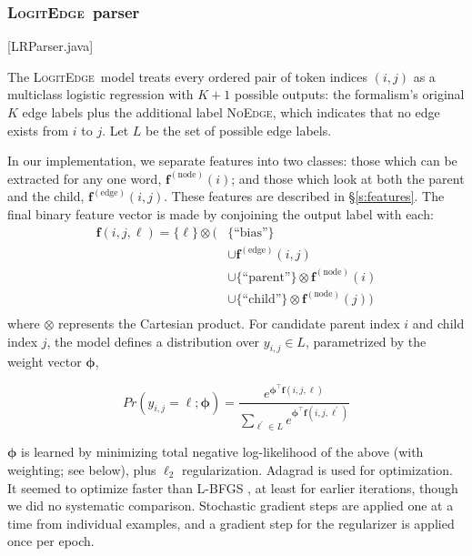 \documentclass[11pt]{article}
\newcommand{\codenote}[1]{\textcolor{PineGreen}{[#1]}}
\newcommand{\logitedge}{\textsc{LogitEdge}}
\newcommand{\noedge}{\textsc{NoEdge}}
\begin{document}
\subsubsection{\logitedge\ parser} 
\label{s:logitedge}


\codenote{LRParser.java}

The \logitedge\ model treats every ordered pair of token indices $(i, j)$ as a
multiclass logistic regression with $K+1$ possible outputs:
the formalism's original $K$ edge labels plus the additional label \noedge,
which indicates that no edge exists from $i$ to $j$.
Let $L$ be the set of possible edge labels.

In our implementation, we separate features into two classes:
those which can be extracted for any one word, $\bm{f}^{(\text{node})}(i)$;
and those which look at both the parent and the child,
$\bm{f}^{(\text{edge})}(i, j)$.
These features are described in \S\ref{s:features}.
The final binary feature vector is made by conjoining the output label with
each:
\begin{align*} 
\bm{f}(i, j, \ell) =
\{ \ell \} \otimes (& 
	\{ \text{``bias''} \} \\
	& \cup \bm{f}^{(\text{edge})}(i, j) \\
	& \cup \{ \text{``parent''} \} \otimes \bm{f}^{(\text{node})}(i) \\
	& \cup \{ \text{``child''} \} \otimes \bm{f}^{(\text{node})}(j)
)\\
\end{align*}
\noindent
where  $\otimes$ represents the Cartesian product.
For candidate parent index $i$ and child index $j$, the model defines a
distribution over $y_{i,j} \in L$, parametrized by the weight vector $\bm\phi$,

\begin{equation}
  Pr(y_{i,j}=\ell; \bm\phi)  = \frac{
  	e^{\bm\phi^\top \bm{f}(i, j, \ell)}
  } {
  	\sum_{\ell^\prime \in L} {
  		e^{\bm\phi^\top \bm{f}(i, j, \ell^\prime)}
  	}
  }
\end{equation}

\noindent
$\bm\phi$ is learned by minimizing total negative log-likelihood of the above
(with weighting; see below), plus $\ell_2$ regularization.
Adagrad \cite{duchi_adaptive_2011} is used for optimization.
It seemed to optimize faster than L-BFGS \cite{byrd_limited_1995}, at least for earlier
iterations, though we did no systematic comparison. Stochastic gradient steps are applied one at a time from individual examples, and a gradient step for the regularizer is applied once per epoch.
\end{document}
